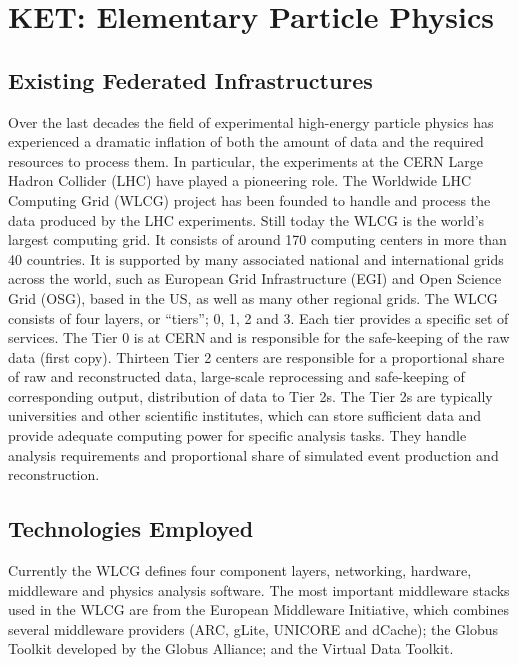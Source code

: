 \section{KET: Elementary Particle Physics}


\subsection{Existing Federated Infrastructures}
Over the last decades the field of experimental high-energy particle
physics has experienced a dramatic inflation of both the amount of
data and the required resources to process them. In particular, the
experiments at the CERN Large Hadron Collider (LHC) have played a
pioneering role. The Worldwide LHC Computing Grid (WLCG) project has
been founded to handle and process the data produced by the LHC
experiments. Still today  the WLCG is the world's largest computing
grid. It consists of around 170 computing centers in more than 40
countries.  It is supported by many associated national and
international grids across the world, such as European Grid
Infrastructure (EGI) and Open Science Grid (OSG), based in the US, as well as many other
regional grids.  The WLCG consists of four layers, or ``tiers''; 0, 1, 2
and 3. Each tier provides a specific set of services. The Tier 0 is at
CERN and is responsible for the safe-keeping of the raw data (first
copy). Thirteen Tier 2 centers are responsible for a proportional
share of raw and reconstructed data, large-scale reprocessing and
safe-keeping of corresponding output, distribution of data to Tier
2s. The Tier 2s are typically universities and other scientific
institutes, which can store sufficient data and provide adequate
computing power for specific analysis tasks. They handle analysis
requirements and proportional share of simulated event production and
reconstruction.


\subsection{Technologies Employed}
Currently the WLCG defines four component layers,  networking, hardware, middleware and
physics analysis software. The most important middleware stacks used
in the WLCG are from the European Middleware Initiative, which
combines several middleware providers (ARC, gLite, UNICORE and
dCache); the Globus Toolkit developed by the Globus Alliance; and the
Virtual Data Toolkit.



